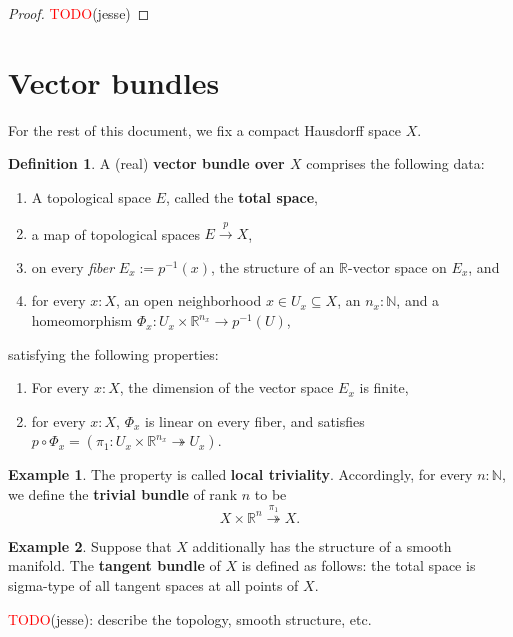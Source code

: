\documentclass[11pt]{article}
\newcommand{\R}{\mathbb{R}}
\newcommand{\remph}[1]{\textcolor{red}{#1}}
\newcommand{\TODO}{\remph{TODO}}
\theoremstyle{plain}
\theoremstyle{definition}
\newtheorem{definition}{Definition}[section]
\newtheorem{example}{Example}[section]
\newcommand{\N}{\mathbb{N}}
\begin{document}
\begin{proof}
  \TODO(jesse)
\end{proof}

\section{Vector bundles}
For the rest of this document, we fix a compact Hausdorff space \(X\).
\begin{definition}

\label{def:vector-bundle}
 A (real) \textbf{vector bundle over \(X\)} comprises the following data:
  \begin{enumerate}[label={(\roman*)}]
  \item A topological space \(E\), called the \textbf{total space},
  \item a map of topological spaces \(E \overset{p}{\to} X\),
  \item on every \emph{fiber} \(E_x := p^{-1}(x)\), the structure of an \(\R\)-vector space on \(E_x\), and
  \item for every \(x : X\), an open neighborhood \(x \in U_x \subseteq X\), an \(n_x : \N\), and a homeomorphism \(\Phi_x : U_x \times \R^{n_x} \to p^{-1}(U)\),
  \end{enumerate}

  satisfying the following properties:
\begin{enumerate}[label={(\alph*)}]
  \item For every \(x : X\), the dimension of the vector space \(E_x\) is finite,
  \item \label{local-triviality} for every \(x : X\), \(\Phi_x\) is linear on every fiber, and satisfies \(p \circ \Phi_x = (\pi_1 : U_x \times \R^{n_x} \twoheadrightarrow U_x)\).
\end{enumerate}  
\end{definition}

\begin{example}\label{example-trivial-bundle}
  The property  is called \textbf{local triviality}. Accordingly, for every \(n : \N\), we define the \textbf{trivial bundle} of rank \(n\) to be
  \[
    X \times \R^n \overset{\pi_1}{\twoheadrightarrow} X.
  \]
\end{example}

\begin{example}\label{example-tangent-bundle}
  Suppose that \(X\) additionally has the structure of a smooth manifold. The \textbf{tangent bundle} of \(X\) is defined as follows: the total space is sigma-type of all tangent spaces at all points of \(X\).

  \TODO(jesse): describe the topology, smooth structure, etc.
\end{example}
\end{document}
